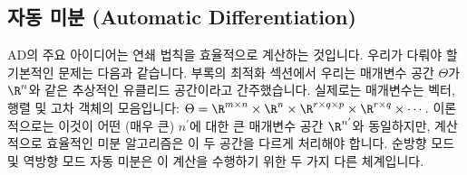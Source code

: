 \documentclass[../../book-main_ko.tex]{subfiles}
\begin{document}
\subsection{자동 미분 (Automatic Differentiation)}

AD의 주요 아이디어는 연쇄 법칙을 효율적으로 계산하는 것입니다.
우리가 다뤄야 할 기본적인 문제는 다음과 같습니다. 부록의 최적화 섹션에서 우리는
매개변수 공간 \(\Theta\)가 \(\R^{n}\)와 같은 추상적인 유클리드 공간이라고 간주했습니다. 실제로는 매개변수는 벡터, 행렬 및 고차 객체의 모음입니다: \(\Theta = \R^{m \times n} \times \R^{n}
\times \R^{r \times q \times p} \times \R^{r \times q} \times \cdots\). 이론적으로는 이것이 어떤 (매우 큰) \(n^{\prime}\)에 대한 큰 매개변수 공간 \(\R^{n^{\prime}}\)와 동일하지만, 계산적으로 효율적인 미분 알고리즘은 이 두 공간을 다르게 처리해야 합니다.
순방향 모드 및 역방향 모드 자동 미분은 이 계산을 수행하기 위한 두 가지 다른 체계입니다.
\end{document}
